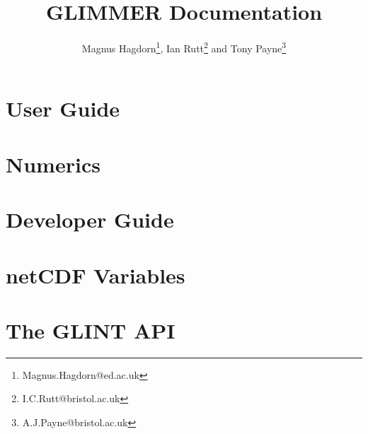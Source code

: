 

\frontmatter
\title{GLIMMER Documentation}
\author{Magnus Hagdorn\thanks{Magnus.Hagdorn@ed.ac.uk}, Ian
  Rutt\thanks{I.C.Rutt@bristol.ac.uk} and Tony Payne\thanks{A.J.Payne@bristol.ac.uk}}
\maketitle
\tableofcontents

\mainmatter
\chapter{User Guide}
\newcommand{\dir}{ug}


\chapter{Numerics}
\renewcommand{\dir}{num}


\chapter{Developer Guide}
\renewcommand{\dir}{dg}


\appendix
\renewcommand{\dir}{ug}
\chapter{netCDF Variables}

\chapter{The GLINT API}


